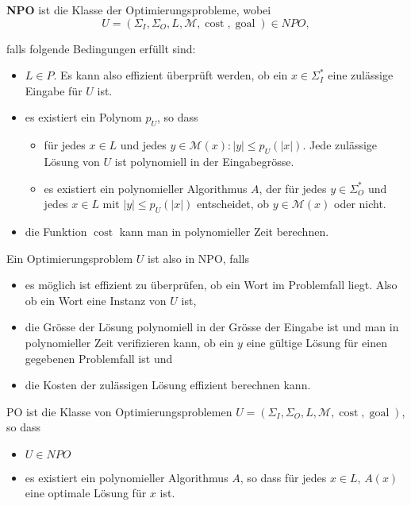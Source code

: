 \begin{definition}
\textbf{NPO} ist die Klasse der Optimierungsprobleme, wobei
\[
U = (\Sigma_I, \Sigma_O, L, \mathcal{M}, \operatorname{cost}, \operatorname{goal}) \in NPO,
\]

falls folgende Bedingungen erfüllt sind:
\begin{itemize}
  \item \(L \in P\). Es kann also effizient überprüft werden, ob ein \(x \in \Sigma_I^*\) eine zulässige Eingabe für \(U\) ist.
  \item es existiert ein Polynom \(p_U\), so dass
  \begin{itemize}
    \item für jedes \(x \in L\) und jedes \(y \in \mathcal{M}(x): |y| \leq p_U(|x|)\). Jede zulässige Lösung von \(U\) ist polynomiell in der Eingabegrösse.
    \item es existiert ein polynomieller Algorithmus \(A\), der für jedes \(y \in \Sigma_O^*\) und jedes \(x \in L\) mit \(|y| \leq p_U(|x|)\) entscheidet, ob \(y \in \mathcal{M}(x)\) oder nicht.
  \end{itemize}
  \item die Funktion \(\operatorname{cost}\) kann man in polynomieller Zeit berechnen.\\
\end{itemize}
\end{definition}

Ein Optimierungsproblem \(U\) ist also in NPO, falls
\begin{itemize}
  \item es möglich ist effizient zu überprüfen, ob ein Wort im Problemfall liegt. Also ob ein Wort eine Instanz von \(U\) ist,
  \item die Grösse der Lösung polynomiell in der Grösse der Eingabe ist und man in polynomieller Zeit verifizieren kann, ob ein \(y\) eine gültige Lösung für einen gegebenen Problemfall ist und
  \item die Kosten der zulässigen Lösung effizient berechnen kann.
\end{itemize}

\begin{definition}
PO ist die Klasse von Optimierungsproblemen \(U = (\Sigma_I, \Sigma_O, L, \mathcal{M}, \operatorname{cost}, \operatorname{goal})\), so dass
\begin{itemize}
  \item \(U \in NPO\)
  \item es existiert ein polynomieller Algorithmus \(A\), so dass für jedes \(x \in L\), \(A(x)\) eine optimale Lösung für \(x\) ist.\\
\end{itemize}
\end{definition}

